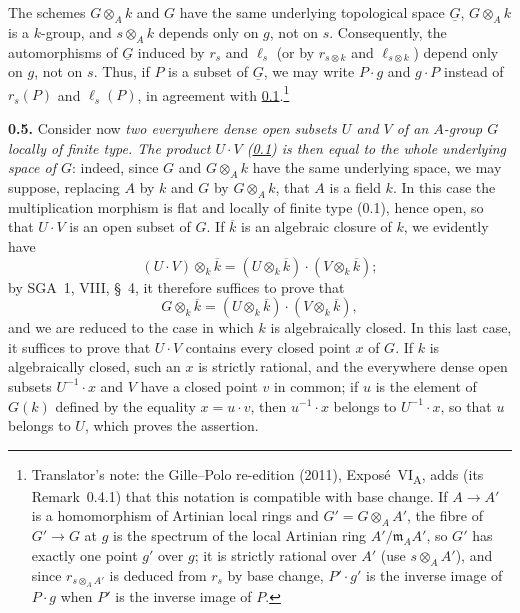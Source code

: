 The schemes \(G\otimes_A k\) and \(G\) have the same underlying
topological space \(\underline G\), \(G\otimes_A k\) is a \(k\)-group,
and \(s\otimes_A k\) depends only on \(g\), not on \(s\). Consequently,
the automorphisms of \(\underline G\) induced by \(r_s\) and \(\ell_s\)
(or by \(r_{s\otimes k}\) and \(\ell_{s\otimes k}\)) depend only on \(g\),
not on \(s\). Thus, if \(P\) is a subset of \(\underline G\), we may write
\(P\cdot g\) and \(g\cdot P\) instead of \(r_s(P)\) and \(\ell_s(P)\), in agreement with
\hyperref[sga3:VIA:0.1]{0.1}.\footnote{Translator's note: the Gille--Polo re-edition (2011),
Exposé~VI\textsubscript{A}, adds (its Remark~0.4.1) that this notation is compatible with base
change. If \(A\to A'\) is a homomorphism of Artinian local rings and \(G'=G\otimes_AA'\), the fibre
of \(G'\to G\) at \(g\) is the spectrum of the local Artinian ring \(A'/\mathfrak m_AA'\), so
\(G'\) has exactly one point \(g'\) over \(g\); it is strictly rational over \(A'\) (use
\(s\otimes_AA'\)), and since \(r_{s\otimes_AA'}\) is deduced from \(r_s\) by base change, \(P'\cdot g'\)
is the inverse image of \(P\cdot g\) when \(P'\) is the inverse image of \(P\).}

\medskip
\noindent{}\textbf{0.5.}
\label{sga3:VIA:0.5}
Consider now \emph{two everywhere dense open subsets \(U\) and \(V\) of an
\(A\)-group \(G\) locally of finite type. The product \(U\cdot V\)
\textup{(\hyperref[sga3:VIA:0.1]{0.1})} is then equal to the whole underlying space of \(G\)}:
indeed, since \(G\) and \(G\otimes_A k\) have the same underlying space, we
may suppose, replacing \(A\) by \(k\) and \(G\) by \(G\otimes_A k\), that
\(A\) is a field \(k\). In this case the multiplication morphism is flat
and locally of finite type (0.1), hence open, so that \(U\cdot V\) is an
open subset of \(G\). If \(\overline k\) is an algebraic closure of \(k\),
we evidently have
\[
  (U\cdot V)\otimes_k\overline k
  =(U\otimes_k\overline k)\cdot(V\otimes_k\overline k);
\]
by SGA~1, VIII, \S~4, it therefore suffices to prove that
\[
  G\otimes_k\overline k
  =(U\otimes_k\overline k)\cdot(V\otimes_k\overline k),
\]
and we are reduced to the case in which \(k\) is algebraically closed. In
this last case, it suffices to prove that \(U\cdot V\) contains every
closed point \(x\) of \(G\). If \(k\) is algebraically closed, such an
\(x\) is strictly rational, and the everywhere dense open subsets
\(U^{-1}\cdot x\) and \(V\) have a closed point \(v\) in common; if \(u\)
is the element of \(G(k)\) defined by the equality \(x=u\cdot v\), then
\(u^{-1}\cdot x\) belongs to \(U^{-1}\cdot x\), so that \(u\) belongs to
\(U\), which proves the assertion.

